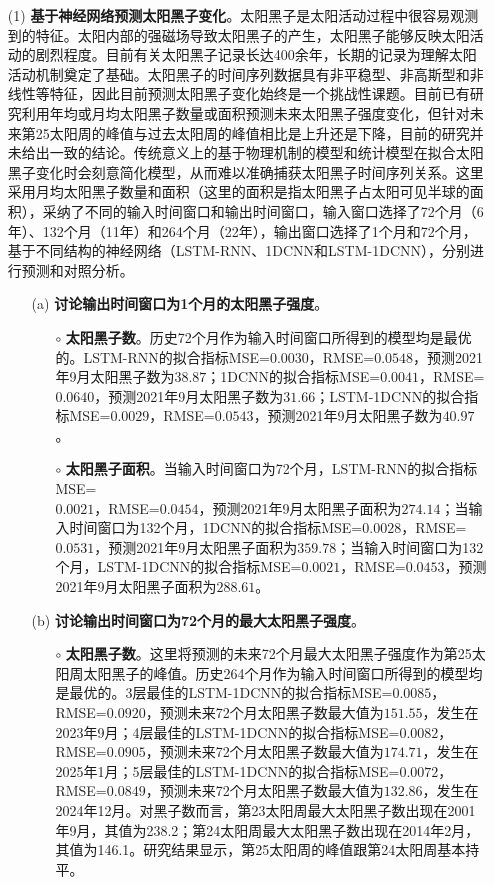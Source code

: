\begin{enumerate}
  \item[(1)] \textbf{基于神经网络预测太阳黑子变化}。太阳黑子是太阳活动过程中很容易观测到的特征。太阳内部的强磁场导致太阳黑子的产生，太阳黑子能够反映太阳活动的剧烈程度。目前有关太阳黑子记录长达400余年，长期的记录为理解太阳活动机制奠定了基础。太阳黑子的时间序列数据具有非平稳型、非高斯型和非线性等特征，因此目前预测太阳黑子变化始终是一个挑战性课题。目前已有研究利用年均或月均太阳黑子数量或面积预测未来太阳黑子强度变化，但针对未来第25太阳周的峰值与过去太阳周的峰值相比是上升还是下降，目前的研究并未给出一致的结论。传统意义上的基于物理机制的模型和统计模型在拟合太阳黑子变化时会刻意简化模型，从而难以准确捕获太阳黑子时间序列关系。这里采用月均太阳黑子数量和面积（这里的面积是指太阳黑子占太阳可见半球的面积），采纳了不同的输入时间窗口和输出时间窗口，输入窗口选择了72个月（6年）、132个月（11年）和264个月（22年），输出窗口选择了1个月和72个月，基于不同结构的神经网络（LSTM-RNN、1DCNN和LSTM-1DCNN），分别进行预测和对照分析。
  \begin{itemize}
    \item[(a)] \textbf{讨论输出时间窗口为1个月的太阳黑子强度}。
    \begin{itemize}
      \item[$\circ$] \textbf{太阳黑子数}。历史72个月作为输入时间窗口所得到的模型均是最优的。LSTM-RNN的拟合指标MSE=$0.0030$，RMSE=$0.0548$，预测2021年9月太阳黑子数为$38.87$；1DCNN的拟合指标MSE=$0.0041$，RMSE=$0.0640$，预测2021年9月太阳黑子数为$31.66$；LSTM-1DCNN的拟合指标MSE=$0.0029$，RMSE=$0.0543$，预测2021年9月太阳黑子数为$40.97$。
      \item[$\circ$] \textbf{太阳黑子面积}。当输入时间窗口为72个月，LSTM-RNN的拟合指标MSE=\\$0.0021$，RMSE=$0.0454$，预测2021年9月太阳黑子面积为$274.14$；当输入时间窗口为132个月，1DCNN的拟合指标MSE=$0.0028$，RMSE=$0.0531$，预测2021年9月太阳黑子面积为$359.78$；当输入时间窗口为132个月，LSTM-1DCNN的拟合指标MSE=$0.0021$，RMSE=$0.0453$，预测2021年9月太阳黑子面积为$288.61$。
    \end{itemize}
    \item[(b)] \textbf{讨论输出时间窗口为72个月的最大太阳黑子强度}。
    \begin{itemize}
      \item[$\circ$] \textbf{太阳黑子数}。这里将预测的未来72个月最大太阳黑子强度作为第25太阳周太阳黑子的峰值。历史264个月作为输入时间窗口所得到的模型均是最优的。3层最佳的LSTM-1DCNN的拟合指标MSE=$0.0085$，RMSE=$0.0920$，预测未来72个月太阳黑子数最大值为$151.55$，发生在2023年9月；4层最佳的LSTM-1DCNN的拟合指标MSE=$0.0082$，RMSE=$0.0905$，预测未来72个月太阳黑子数最大值为$174.71$，发生在2025年1月；5层最佳的LSTM-1DCNN的拟合指标MSE=$0.0072$，RMSE=$0.0849$，预测未来72个月太阳黑子数最大值为$132.86$，发生在2024年12月。对黑子数而言，第23太阳周最大太阳黑子数出现在2001年9月，其值为238.2；第24太阳周最大太阳黑子数出现在2014年2月，其值为146.1。研究结果显示，第25太阳周的峰值跟第24太阳周基本持平。 

\end{itemize}
\end{itemize}
\end{enumerate}
